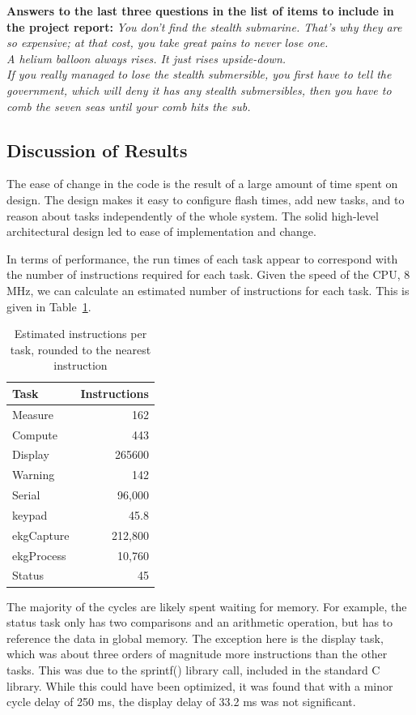\documentclass[12pt]{article} %
\begin{document}
    \textbf{Answers to the last three questions in the list of items to include
    in the project report:}
    \emph{You don't find the stealth submarine. That's why they are so expensive; at that cost, you take great pains to never lose one.\\  A helium balloon always rises. It just rises upside-down. \\ If you really managed to lose the stealth submersible, you first have to tell the government, which will deny it has any stealth submersibles, then you have to comb the seven seas until your comb hits the sub.}

    \subsection{Discussion of Results}
    The ease of change in the code is the result of a large amount of time spent on
    design. The design makes it easy to configure flash times, add new tasks, and
    to reason about tasks independently of the whole system. The solid high-level
    architectural design led to ease of implementation and change.

    In terms of performance, the run times of each task appear to correspond with
    the number of instructions required for each task. Given the speed of the CPU,
    8 MHz, we can calculate an estimated number of instructions for each task.
    This is given in Table~\ref{tab:instr}.
    \begin{table}[h]
      \centering
      \begin{tabular}{|l|r|} 
	\hline
	Task & Instructions \\ \hline
	Measure & 162 \\ \hline
	Compute & 443 \\ \hline
	Display & 265600 \\ \hline
	Warning & 142 \\ \hline
    Serial & 96,000 \\ \hline
    keypad & 45.8 \\ \hline
    ekgCapture & 212,800 \\ \hline
    ekgProcess & 10,760 \\ \hline
	Status & 45 \\ \hline
      \end{tabular}
      \caption{Estimated instructions per task, rounded to the nearest instruction}
      \label{tab:instr}
    \end{table}
    The majority of the cycles are likely spent waiting for memory. For example,
    the status task only has two comparisons and an arithmetic operation, but has
    to reference the data in global memory. The exception here is the display
    task, which was about three orders of magnitude more instructions than the
    other tasks. This was due to the sprintf() library call, included in the
    standard C library. While this could have been optimized, it was found that
    with a minor cycle delay of 250 ms, the display delay of 33.2 ms was not
    significant.
\end{document}
